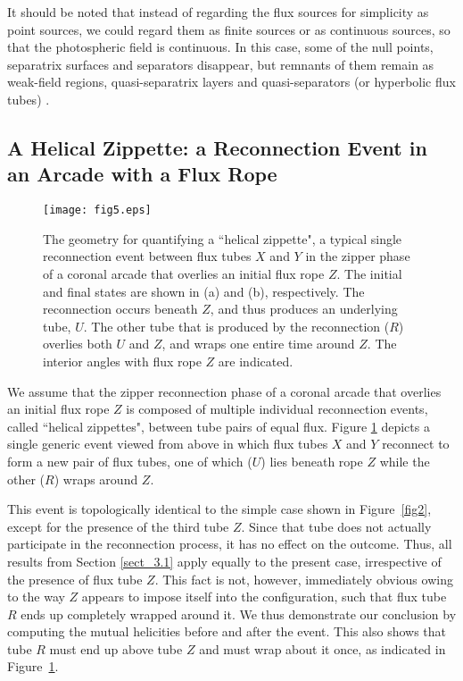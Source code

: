 \documentclass[10pt,namedreferneces]{SolarPhysics}
\begin{document}
\begin{article}
It should be noted that instead of regarding the flux sources  for simplicity as point sources,  we could regard them as finite sources or as continuous sources, so that the photospheric field is continuous.  In this case, some of the null points, separatrix surfaces and separators disappear, but remnants of them remain as weak-field regions, quasi-separatrix layers and quasi-separators (or hyperbolic flux tubes) \cite{priest95a,demoulin96a,demoulin97d,aulanier05a,aulanier06a,aulanier07}.

\subsection{\bf A Helical Zippette: a Reconnection Event in an Arcade with a Flux Rope} 
\label{sect_3.3}

\begin{figure}[h]
{\centering
 \texttt{[image: fig5.eps]}
\caption{The geometry for quantifying a ``helical zippette", a typical single reconnection event between flux tubes $X$ and $Y$ in the zipper phase of a coronal arcade that overlies an initial flux rope $Z$. The initial and final states are shown in (a) and (b), respectively.  The reconnection occurs beneath $Z$, and thus produces an underlying tube, $U$.  The other  tube that is produced by the reconnection ($R$) overlies both $U$ and $Z$, and wraps one entire time around $Z$.  The interior angles with flux rope $Z$ are indicated.}
\label{fig5}}
\end{figure}
We assume that the zipper reconnection phase of a coronal arcade that overlies an initial flux rope $Z$ is composed of multiple individual reconnection events, called ``helical zippettes", between tube pairs of equal flux. Figure \ref{fig5} depicts a single generic event viewed from above in which flux tubes $X$ and $Y$ reconnect to form a new pair of flux tubes, one of which ($U$) lies beneath rope $Z$ while the other ($R$) wraps around $Z$.

This event is topologically identical to the simple case shown in Figure\ \ref{fig2}, except for the presence of the third tube $Z$.  Since that tube does not actually participate in the reconnection process, it has no effect on the outcome. Thus, all results from Section \ref{sect_3.1} apply equally to the present case, irrespective of the presence of flux tube $Z$.  This fact is not, however, immediately obvious owing to the way $Z$ appears to impose itself into the configuration, such that flux tube $R$ ends up completely wrapped around it.  We thus demonstrate our conclusion by computing the mutual helicities before and after the event.  This also shows that tube $R$ must end up above tube $Z$ and must wrap about it once, as indicated in Figure\  \ref{fig5}.


\end{article}
\end{document}
